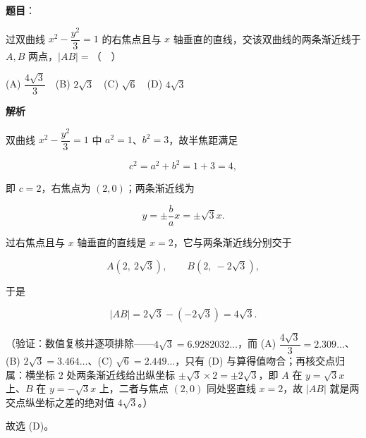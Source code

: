 \begin{answer}

\textbf{题目}：

过双曲线 \(x^2-\dfrac{y^2}{3}=1\) 的右焦点且与 \(x\) 轴垂直的直线，交该双曲线的两条渐近线于 \(A,B\) 两点，\(|AB|=\)（　）

(A) \(\dfrac{4\sqrt{3}}{3}\)　(B) \(2\sqrt{3}\)　(C) \(\sqrt{6}\)　(D) \(4\sqrt{3}\)

\textbf{解析}

双曲线 \(x^2-\dfrac{y^2}{3}=1\) 中 \(a^2=1\)、\(b^2=3\)，故半焦距满足

\nopagebreak[4]
\[
c^2=a^2+b^2=1+3=4,
\]

即 \(c=2\)，右焦点为 \((2,0)\)；两条渐近线为

\nopagebreak[4]
\[
y=\pm\dfrac{b}{a}x=\pm\sqrt{3} x.
\]

过右焦点且与 \(x\) 轴垂直的直线是 \(x=2\)，它与两条渐近线分别交于

\nopagebreak[4]
\[
A(2,\ 2\sqrt{3}),\qquad B(2,\ -2\sqrt{3}),
\]

于是

\nopagebreak[4]
\[
|AB|=2\sqrt{3}-(-2\sqrt{3})=4\sqrt{3}.
\]

（验证：数值复核并逐项排除——\(4\sqrt{3}=6.9282032\ldots\)，而 (A) \(\dfrac{4\sqrt{3}}{3}=2.309\ldots\)、(B) \(2\sqrt{3}=3.464\ldots\)、(C) \(\sqrt{6}=2.449\ldots\)，只有 (D) 与算得值吻合；再核交点归属：横坐标 \(2\) 处两条渐近线给出纵坐标 \(\pm\sqrt{3}\times2=\pm2\sqrt{3}\)，即 \(A\) 在 \(y=\sqrt{3}x\) 上、\(B\) 在 \(y=-\sqrt{3}x\) 上，二者与焦点 \((2,0)\) 同处竖直线 \(x=2\)，故 \(|AB|\) 就是两交点纵坐标之差的绝对值 \(4\sqrt{3}\)。）

故选 (D)。


\end{answer}
